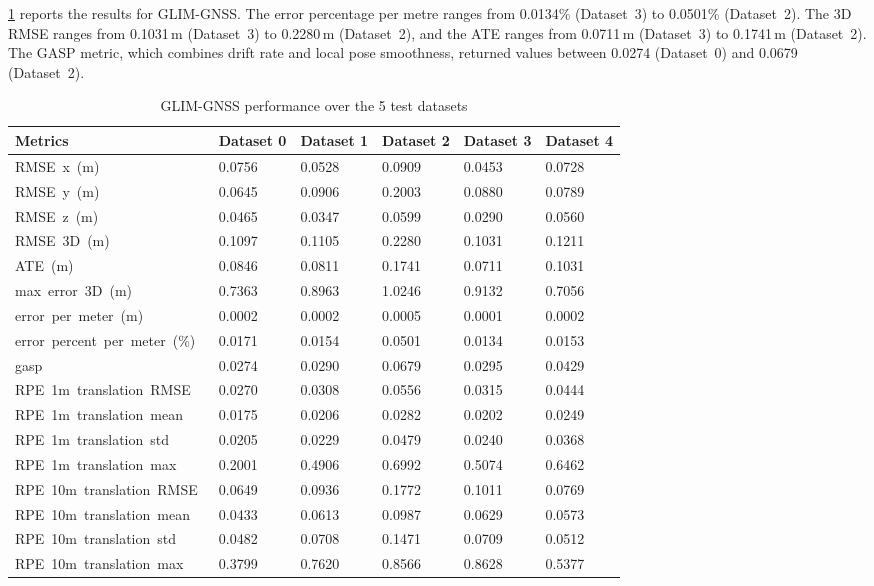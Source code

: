 \cref{tab:proposed_performance} reports the results for GLIM-GNSS. The error percentage per metre ranges from 0.0134\% (Dataset~3) to 0.0501\% (Dataset~2). The 3D RMSE ranges from 0.1031\,m (Dataset~3) to 0.2280\,m (Dataset~2), and the ATE ranges from 0.0711\,m (Dataset~3) to 0.1741\,m (Dataset~2). The GASP metric, which combines drift rate and local pose smoothness, returned values between 0.0274 (Dataset~0) and 0.0679 (Dataset~2).

\begin{table}[htbp]
\centering
\caption{GLIM-GNSS performance over the 5 test datasets}
\label{tab:proposed_performance}
\begin{tabularx}{\textwidth}{lXXXXX}
\toprule
\textbf{Metrics} & \textbf{Dataset 0} & \textbf{Dataset 1} & \textbf{Dataset 2} & \textbf{Dataset 3} & \textbf{Dataset 4} \\ \midrule
RMSE\ x\ (m)\ & 0.0756 & 0.0528 & 0.0909 & 0.0453 & 0.0728 \\
RMSE\ y\ (m)\ & 0.0645 & 0.0906 & 0.2003 & 0.0880 & 0.0789 \\
RMSE\ z\ (m)\ & 0.0465 & 0.0347 & 0.0599 & 0.0290 & 0.0560 \\
RMSE\ 3D\ (m)\ & 0.1097 & 0.1105 & 0.2280 & 0.1031 & 0.1211 \\
ATE\ (m)\ & 0.0846 & 0.0811 & 0.1741 & 0.0711 & 0.1031 \\
max\ error\ 3D\ (m)\ & 0.7363 & 0.8963 & 1.0246 & 0.9132 & 0.7056 \\
error\ per\ meter\ (m)\ & 0.0002 & 0.0002 & 0.0005 & 0.0001 & 0.0002 \\
error\ percent\ per\ meter\ (\%)\ & 0.0171 & 0.0154 & 0.0501 & 0.0134 & 0.0153 \\
gasp & 0.0274 & 0.0290 & 0.0679 & 0.0295 & 0.0429 \\
RPE\ 1m\ translation\ RMSE\ & 0.0270 & 0.0308 & 0.0556 & 0.0315 & 0.0444 \\
RPE\ 1m\ translation\ mean\ & 0.0175 & 0.0206 & 0.0282 & 0.0202 & 0.0249 \\
RPE\ 1m\ translation\ std\ & 0.0205 & 0.0229 & 0.0479 & 0.0240 & 0.0368 \\
RPE\ 1m\ translation\ max\ & 0.2001 & 0.4906 & 0.6992 & 0.5074 & 0.6462 \\
RPE\ 10m\ translation\ RMSE\ & 0.0649 & 0.0936 & 0.1772 & 0.1011 & 0.0769 \\
RPE\ 10m\ translation\ mean\ & 0.0433 & 0.0613 & 0.0987 & 0.0629 & 0.0573 \\
RPE\ 10m\ translation\ std\ & 0.0482 & 0.0708 & 0.1471 & 0.0709 & 0.0512 \\
RPE\ 10m\ translation\ max\ & 0.3799 & 0.7620 & 0.8566 & 0.8628 & 0.5377 \\ \bottomrule
\end{tabularx}
\end{table}

